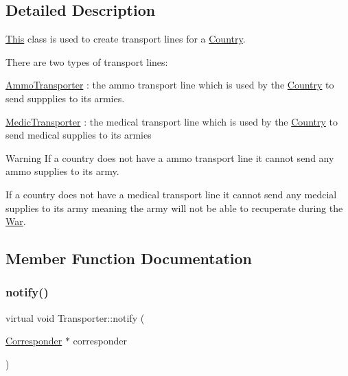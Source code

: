 \subsection{Detailed Description}
\mbox{\hyperlink{class_this}{This}} class is used to create transport lines for a \mbox{\hyperlink{class_country}{Country}}.

There are two types of transport lines\+:
\begin{DoxyItemize}
\item \mbox{\hyperlink{class_ammo_transporter}{Ammo\+Transporter}} \+: the ammo transport line which is used by the \mbox{\hyperlink{class_country}{Country}} to send suppplies to its armies.
\item \mbox{\hyperlink{class_medic_transporter}{Medic\+Transporter}} \+: the medical transport line which is used by the \mbox{\hyperlink{class_country}{Country}} to send medical supplies to its armies
\end{DoxyItemize}

\begin{DoxyWarning}{Warning}
If a country does not have a ammo transport line it cannot send any ammo supplies to its army. 

If a country does not have a medical transport line it cannot send any medcial supplies to its army meaning the army will not be able to recuperate during the \mbox{\hyperlink{class_war}{War}}. 
\end{DoxyWarning}


\subsection{Member Function Documentation}
\mbox{\label{class_transporter_aadf5e8b8dabe203e8b184ae00847c249}} 
\subsubsection{\texorpdfstring{notify()}{notify()}}
{\footnotesize\ttfamily virtual void Transporter\+::notify (\begin{DoxyParamCaption}\item[{\mbox{\hyperlink{class_corresponder}{Corresponder}} $\ast$}]{corresponder }\end{DoxyParamCaption})\hspace{0.3cm}{\ttfamily [pure virtual]}}



